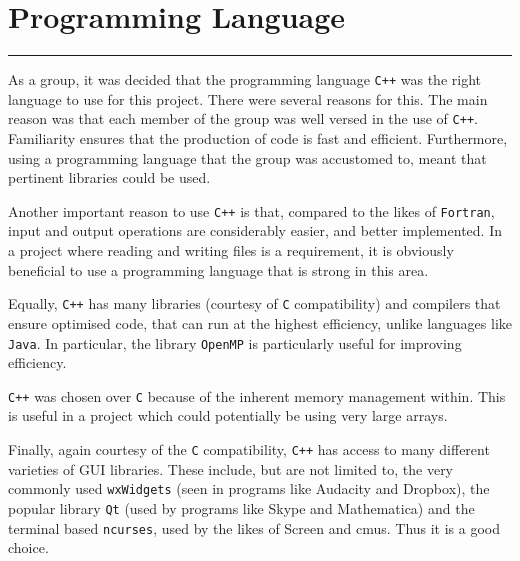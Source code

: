 \section{Programming Language}
\vspace{-2em}\rule{\textwidth}{1pt}\vspace{1em}

As a group, it was decided that the programming language \texttt{C++} was the right language to use for this project.
There were several reasons for this.
The main reason was that each member of the group was well versed in the use of \texttt{C++}.
Familiarity ensures that the production of code is fast and efficient.
Furthermore, using a programming language that the group was accustomed to, meant that pertinent libraries could be used.

Another important reason to use \texttt{C++} is that, compared to the likes of \texttt{Fortran}, input and output operations are considerably easier, and better implemented.
In a project where reading and writing files is a requirement, it is obviously beneficial to use a programming language that is strong in this area.

Equally, \texttt{C++} has many libraries (courtesy of \texttt{C} compatibility) and compilers that ensure optimised code, that can run at the highest efficiency, unlike languages like \texttt{Java}.
In particular, the library \texttt{OpenMP} is particularly useful for improving efficiency.

\texttt{C++} was chosen over \texttt{C} because of the inherent memory management within.
This is useful in a project which could potentially be using very large arrays.

Finally, again courtesy of the \texttt{C} compatibility, \texttt{C++} has access to many different varieties of GUI libraries.
These include, but are not limited to, the very commonly used \texttt{wxWidgets} (seen in programs like Audacity and Dropbox), the popular library \texttt{Qt} (used by programs like Skype and Mathematica) and the terminal based \texttt{ncurses}, used by the likes of Screen and cmus.
Thus it is a good choice.
